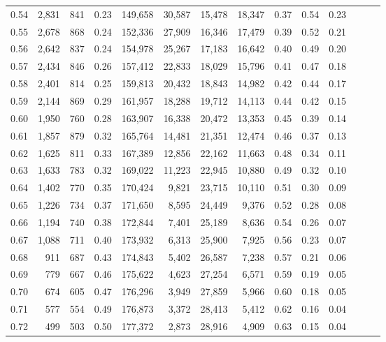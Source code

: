 \begin{tabular}{rrrrrrrrrrrrrr}
0.54 &  2,831 &  841 &  0.23 &  149,658 &   30,587 &  15,478 &  18,347 &  0.37 &  0.54 &      0.23 \\
0.55 &  2,678 &  868 &  0.24 &  152,336 &   27,909 &  16,346 &  17,479 &  0.39 &  0.52 &      0.21 \\
0.56 &  2,642 &  837 &  0.24 &  154,978 &   25,267 &  17,183 &  16,642 &  0.40 &  0.49 &      0.20 \\
0.57 &  2,434 &  846 &  0.26 &  157,412 &   22,833 &  18,029 &  15,796 &  0.41 &  0.47 &      0.18 \\
0.58 &  2,401 &  814 &  0.25 &  159,813 &   20,432 &  18,843 &  14,982 &  0.42 &  0.44 &      0.17 \\
0.59 &  2,144 &  869 &  0.29 &  161,957 &   18,288 &  19,712 &  14,113 &  0.44 &  0.42 &      0.15 \\
0.60 &  1,950 &  760 &  0.28 &  163,907 &   16,338 &  20,472 &  13,353 &  0.45 &  0.39 &      0.14 \\
0.61 &  1,857 &  879 &  0.32 &  165,764 &   14,481 &  21,351 &  12,474 &  0.46 &  0.37 &      0.13 \\
0.62 &  1,625 &  811 &  0.33 &  167,389 &   12,856 &  22,162 &  11,663 &  0.48 &  0.34 &      0.11 \\
0.63 &  1,633 &  783 &  0.32 &  169,022 &   11,223 &  22,945 &  10,880 &  0.49 &  0.32 &      0.10 \\
0.64 &  1,402 &  770 &  0.35 &  170,424 &    9,821 &  23,715 &  10,110 &  0.51 &  0.30 &      0.09 \\
0.65 &  1,226 &  734 &  0.37 &  171,650 &    8,595 &  24,449 &   9,376 &  0.52 &  0.28 &      0.08 \\
0.66 &  1,194 &  740 &  0.38 &  172,844 &    7,401 &  25,189 &   8,636 &  0.54 &  0.26 &      0.07 \\
0.67 &  1,088 &  711 &  0.40 &  173,932 &    6,313 &  25,900 &   7,925 &  0.56 &  0.23 &      0.07 \\
0.68 &    911 &  687 &  0.43 &  174,843 &    5,402 &  26,587 &   7,238 &  0.57 &  0.21 &      0.06 \\
0.69 &    779 &  667 &  0.46 &  175,622 &    4,623 &  27,254 &   6,571 &  0.59 &  0.19 &      0.05 \\
0.70 &    674 &  605 &  0.47 &  176,296 &    3,949 &  27,859 &   5,966 &  0.60 &  0.18 &      0.05 \\
0.71 &    577 &  554 &  0.49 &  176,873 &    3,372 &  28,413 &   5,412 &  0.62 &  0.16 &      0.04 \\
0.72 &    499 &  503 &  0.50 &  177,372 &    2,873 &  28,916 &   4,909 &  0.63 &  0.15 &      0.04 \\

\end{tabular}
